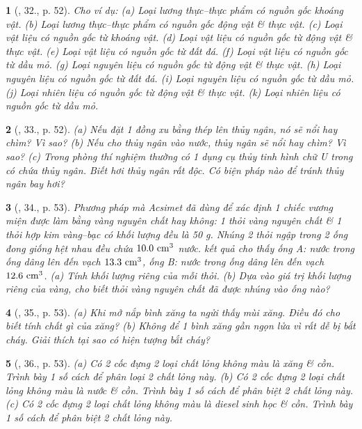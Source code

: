 \documentclass{article}
\newtheorem{baitoan}{}
\begin{document}
\begin{baitoan}[\cite{ncpt_KHTN_6_tap_1}, 32., p. 52]
	Cho ví dụ: (a) Loại lương thực--thực phẩm có nguồn gốc khoáng vật. (b) Loại lương thực--thực phẩm có nguồn gốc động vật \& thực vật. (c) Loại vật liệu có nguồn gốc từ khoáng vật. (d) Loại vật liệu có nguồn gốc từ động vật \& thực vật. (e) Loại vật liệu có nguồn gốc từ đất đá. (f) Loại vật liệu có nguồn gốc từ dầu mỏ. (g) Loại nguyên liệu có nguồn gốc từ động vật \& thực vật. (h) Loại nguyên liệu có nguồn gốc từ đất đá. (i) Loại nguyên liệu có nguồn gốc từ dầu mỏ. (j) Loại nhiên liệu có nguồn gốc từ động vật \& thực vật. (k) Loại nhiên liệu có nguồn gốc từ dầu mỏ.
\end{baitoan}

\begin{baitoan}[\cite{ncpt_KHTN_6_tap_1}, 33., p. 52]
	(a) Nếu đặt 1 đồng xu bằng thép lên thủy ngân, nó sẽ nổi hay chìm? Vì sao? (b) Nếu cho thủy ngân vào nước, thủy ngân sẽ nổi hay chìm? Vì sao? (c) Trong phòng thí nghiệm thường có 1 dụng cụ thủy tinh hình chữ U trong có chứa thủy ngân. Biết hơi thủy ngân rất độc. Có biện pháp nào để tránh thủy ngân bay hơi?
\end{baitoan}

\begin{baitoan}[\cite{ncpt_KHTN_6_tap_1}, 34., p. 53]
	Phương pháp mà Acsimet đã dùng để xác định 1 chiếc vương miện được làm bằng vàng nguyên chất hay không: 1 thỏi vàng nguyên chất \& 1 thỏi hợp kim vàng--bạc có khối lượng đều là {\rm50 g}. Nhúng 2 thỏi ngập trong 2 ống đong giống hệt nhau đều chứa $\rm10.0\ cm^3$ nước. kết quả cho thấy ống A: nước trong ống dâng lên đến vạch $\rm13.3\ cm^3$, ống B: nước trong ống dâng lên đến vạch $\rm12.6\ cm^3$. (a) Tính khối lượng riêng của mỗi thỏi. (b) Dựa vào giá trị khối lượng riêng của vàng, cho biết thỏi vàng nguyên chất đã được nhúng vào ống nào? 
\end{baitoan}

\begin{baitoan}[\cite{ncpt_KHTN_6_tap_1}, 35., p. 53]
	(a) Khi mở nắp bình xăng ta ngửi thấy mùi xăng. Điều đó cho biết tính chất gì của xăng? (b) Không để 1 bình xăng gần ngọn lửa vì rất dễ bị bắt cháy. Giải thích tại sao có hiện tượng bắt cháy?
\end{baitoan}

\begin{baitoan}[\cite{ncpt_KHTN_6_tap_1}, 36., p. 53]
	(a) Có 2 cốc đựng 2 loại chất lỏng không màu là xăng \& cồn. Trình bày 1 số cách để phân loại 2 chất lỏng này. (b) Có 2 cốc đựng 2 loại chất lỏng không màu là nước \& cồn. Trình bày 1 số cách để phân biệt 2 chất lỏng này. (c) Có 2 cốc đựng 2 loại chất lỏng không màu là diesel sinh học \& cồn. Trình bày 1 số cách để phân biệt 2 chất lỏng này.
\end{baitoan}
\end{document}
